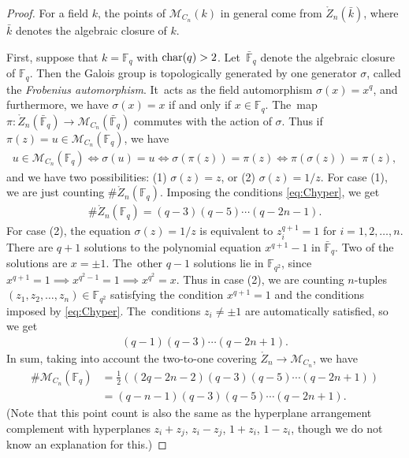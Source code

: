 \documentclass[10pt,a4paper]{amsart}
\def\F{{\mathbb F}}
\def\bF{{\bar \F}}
\def\Zo{{\mathring{Z}}}
\def\M{{\mathcal{M}}}
\numberwithin{equation}{section}
\begin{document}
\begin{proof}
For a field $k$, the points of $\M_{C_n}(k)$ in general come from $\Zo_n(\bar k)$, where $\bar k$ denotes the algebraic closure of $k$.

First, suppose that $k = \F_q$ with ${\rm char}(q) >2$. Let~$\bF_q$ denote the algebraic closure of $\F_q$. Then the Galois group is topologically generated by one generator $\sigma$, called the \emph{Frobenius auto\-morphism}. It~acts as the field automorphism $\sigma(x) = x^q$, and furthermore, we have $\sigma(x) = x$ if and only if $x \in \F_q$. The~map $\pi\colon \Zo_n(\bF_q) \to \M_{C_n}(\bF_q)$ commutes with the action of $\sigma$. Thus if~$\pi(z) = u \in \M_{C_n}(\F_q)$, we have
\begin{gather*}
u \in \M_{C_n}(\F_q) \Leftrightarrow \sigma(u) = u \Leftrightarrow \sigma(\pi(z)) = \pi(z) \Leftrightarrow \pi(\sigma(z)) = \pi(z),
\end{gather*}
and we have two possibilities: (1) $\sigma(z) = z$, or (2) $\sigma(z) = 1/z$. For case (1), we are just counting $\#\Zo_n(\F_q)$. Imposing the conditions \eqref{eq:Chyper}, we get
\begin{gather*}
\#\Zo_n(\F_q) = (q-3)(q-5) \cdots (q-2n-1).
\end{gather*}
For case (2), the equation $\sigma(z) = 1/z$ is equivalent to $z_i^{q+1} = 1$ for $i = 1,2,\dots,n$. There are $q+1$ solutions to the polynomial equation $x^{q+1}-1$ in $\bF_q$. Two of the solutions are $x = \pm 1$. The~other $q-1$ solutions lie in $\F_{q^2}$, since $x^{q+1}=1 \implies x^{q^2-1} = 1 \implies x^{q^2} =x$. Thus in case (2), we are counting $n$-tuples $(z_1,z_2,\dots,z_n) \in \F_{q^2}$ satisfying the condition $x^{q+1} = 1$ and the conditions imposed by \eqref{eq:Chyper}. The~conditions $z_i \neq \pm 1$ are automatically satisfied, so we get
\begin{gather*}
(q-1)(q-3)\cdots (q-2n+1).
\end{gather*}
In sum, taking into account the two-to-one covering $\Zo_n \to \M_{C_n}$, we have
\begin{align*}
\# \M_{C_n}(\F_q) &= \frac{1}{2} \left((2q-2n-2)(q-3)(q-5) \cdots (q-2n+1) \right) \\
& = (q-n-1)(q-3)(q-5) \cdots (q-2n+1).
\end{align*}
(Note that this point count is also the same as the hyperplane arrangement complement with hyperplanes $z_i+z_j$, $z_i - z_j$, $1+z_i$, $1-z_i$, though we do not know an explanation for this.)


\end{proof}
\end{document}
